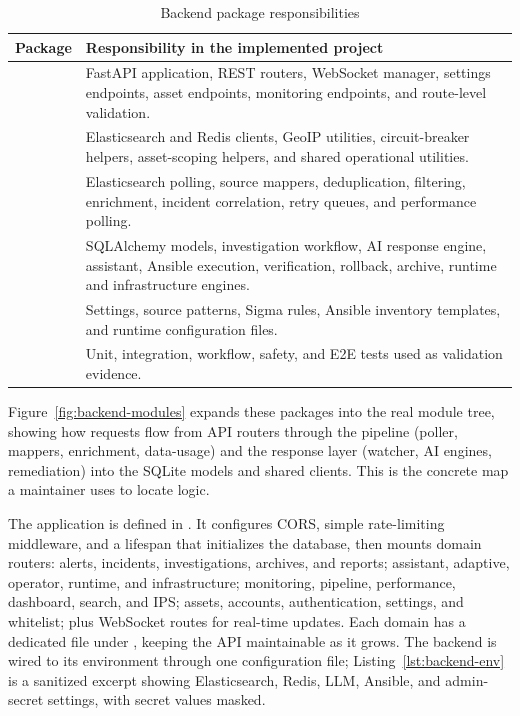 \begin{table}[H]
\centering
\caption{Backend package responsibilities}
\begin{tabularx}{\textwidth}{@{}p{}Y@{}}
\toprule
\textbf{Package} & \textbf{Responsibility in the implemented project} \\
\midrule
{} & FastAPI application, REST routers, WebSocket manager, settings endpoints, asset endpoints, monitoring endpoints, and route-level validation. \\
 & Elasticsearch and Redis clients, GeoIP utilities, circuit-breaker helpers, asset-scoping helpers, and shared operational utilities. \\
 & Elasticsearch polling, source mappers, deduplication, filtering, enrichment, incident correlation, retry queues, and performance polling. \\
 & SQLAlchemy models, investigation workflow, AI response engine, assistant, Ansible execution, verification, rollback, archive, runtime and infrastructure engines. \\
 & Settings, source patterns, Sigma rules, Ansible inventory templates, and runtime configuration files. \\
 & Unit, integration, workflow, safety, and E2E tests used as validation evidence. \\
\bottomrule
\end{tabularx}
\end{table}

Figure~\ref{fig:backend-modules} expands these packages into the real module tree, showing how requests flow from API routers through the pipeline (poller, mappers, enrichment, data-usage) and the response layer (watcher, AI engines, remediation) into the SQLite models and shared  clients. This is the concrete map a maintainer uses to locate logic.


The application is defined in . It configures CORS, simple rate-limiting middleware, and a lifespan that initializes the database, then mounts domain routers: alerts, incidents, investigations, archives, and reports; assistant, adaptive, operator, runtime, and infrastructure; monitoring, pipeline, performance, dashboard, search, and IPS; assets, accounts, authentication, settings, and whitelist; plus WebSocket routes for real-time updates. Each domain has a dedicated file under , keeping the API maintainable as it grows. The backend is wired to its environment through one configuration file; Listing~\ref{lst:backend-env} is a sanitized excerpt showing Elasticsearch, Redis, LLM, Ansible, and admin-secret settings, with secret values masked.

